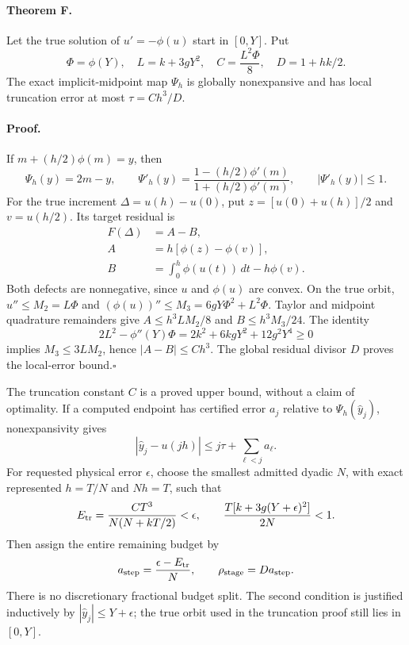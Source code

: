 \paragraph{Theorem F.}
Let the true solution of $u'=-\phi(u)$ start in $[0,Y]$. Put
\begin{equation}
 \Phi=\phi(Y),\quad L=k+3gY^2,\quad
 C=\frac{L^2\Phi}{8},\quad D=1+hk/2.
\end{equation}
The exact implicit-midpoint map $\Psi_h$ is globally nonexpansive and
has local truncation error at most $\tau=Ch^3/D$.

\paragraph{Proof.}
If $m+(h/2)\phi(m)=y$, then
\begin{equation}
 \Psi_h(y)=2m-y,\qquad
 \Psi'_h(y)=\frac{1-(h/2)\phi'(m)}{1+(h/2)\phi'(m)},
 \qquad |\Psi'_h(y)|\le1.
\end{equation}
For the true increment $\Delta=u(h)-u(0)$, put
$z=[u(0)+u(h)]/2$ and $v=u(h/2)$. Its target residual is
\begin{align}
 F(\Delta)&=A-B,\\
 A&=h[\phi(z)-\phi(v)],\\
 B&=\int_0^h\phi(u(t))\,dt-h\phi(v).
\end{align}
Both defects are nonnegative, since $u$ and $\phi(u)$ are convex.
On the true orbit, $u''\le M_2=L\Phi$ and
$(\phi(u))''\le M_3=6gY\Phi^2+L^2\Phi$. Taylor and midpoint quadrature
remainders give $A\le h^3LM_2/8$ and $B\le h^3M_3/24$. The identity
\begin{equation}
 2L^2-\phi''(Y)\Phi=2k^2+6kgY^2+12g^2Y^4\ge0
\end{equation}
implies $M_3\le3LM_2$, hence $|A-B|\le Ch^3$. The global residual
divisor $D$ proves the local-error bound.\hfill$\square$

The truncation constant $C$ is a proved upper bound, without a claim of
optimality. If a computed endpoint has certified error $a_j$ relative to
$\Psi_h(\widehat y_j)$, nonexpansivity gives
\begin{equation}
 |\widehat y_j-u(jh)|\le j\tau+\sum_{\ell<j}a_\ell.
\end{equation}
For requested physical error $\epsilon$, choose the smallest admitted
dyadic $N$, with exact represented $h=T/N$ and $Nh=T$, such that
\begin{equation}
 E_{\rm tr}=\frac{CT^3}{N(N+kT/2)}<\epsilon,
 \qquad \frac{T[k+3g(Y+\epsilon)^2]}{2N}<1.
\end{equation}
Then assign the entire remaining budget by
\begin{equation}
 a_{\rm step}=\frac{\epsilon-E_{\rm tr}}{N},\qquad
 \rho_{\rm stage}=D a_{\rm step}.
\end{equation}
There is no discretionary fractional budget split. The second condition
is justified inductively by $|\widehat y_j|\le Y+\epsilon$; the true
orbit used in the truncation proof still lies in $[0,Y]$.

